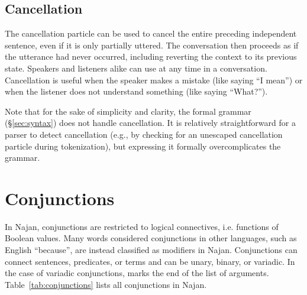 

\subsection{Cancellation} \label{sec:cancellation}

The cancellation particle  can be used to cancel the entire
preceding independent sentence, even if it is only partially uttered. The
conversation then proceeds as if the utterance had never occurred, including
reverting the context to its previous state. Speakers and listeners alike can
use  at any time in a conversation. Cancellation is useful when the
speaker makes a mistake (like saying ``I mean'') or when the listener does not
understand something (like saying ``What?'').

Note that for the sake of simplicity and clarity, the formal grammar
(\S\ref{sec:syntax}) does not handle cancellation. It is relatively
straightforward for a parser to detect cancellation (e.g., by checking for an
unescaped cancellation particle during tokenization), but expressing it formally
overcomplicates the grammar.

\section{Conjunctions} \label{sec:conjunctions}

In Najan, conjunctions are restricted to logical connectives, i.e. functions of
Boolean values. Many words considered conjunctions in other languages, such as
English ``because'', are instead classified as modifiers in Najan. Conjunctions
can connect sentences, predicates, or terms and can be unary, binary, or
variadic. In the case of variadic conjunctions,  marks the end of the
list of arguments. Table~\ref{tab:conjunctions} lists all conjunctions in Najan.

